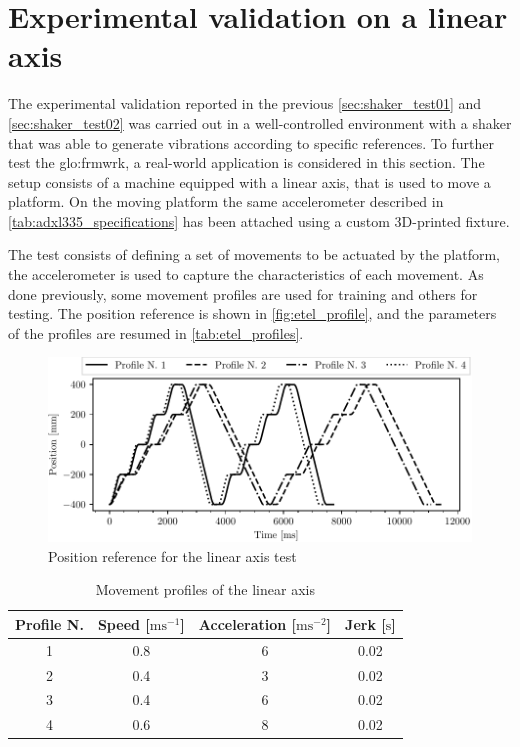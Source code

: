 \clearpage
\section{Experimental validation on a linear axis}
\label{sec:ExperimentalValidation}

The experimental validation reported in the previous \autoref{sec:shaker_test01} and \autoref{sec:shaker_test02} was carried out in a well-controlled environment with a shaker that was able to generate vibrations according to specific references. To further test the \gls{glo:frmwrk}, a real-world application is considered in this section. The setup consists of a machine equipped with a linear axis, that is used to move a platform. On the moving platform the same accelerometer described in \autoref{tab:adxl335_specifications} has been attached using a custom 3D-printed fixture.

The test consists of defining a set of movements to be actuated by the platform, the accelerometer is used to capture the characteristics of each movement. As done previously, some movement profiles are used for training and others for testing. The position reference is shown in \autoref{fig:etel_profile}, and the parameters of the profiles are resumed in \autoref{tab:etel_profiles}.

\begin{figure}
    \centering
    \includegraphics{images/LinearMotor/profiles.pdf}
    \caption{Position reference for the linear axis test}
    \label{fig:etel_profile}
\end{figure}

\begin{table}
    \centering
    \caption{Movement profiles of the linear axis}
    \label{tab:etel_profiles}
    \begin{tabular}{cccc} 
    \toprule
    \textbf{Profile N.} & \textbf{Speed} {[}$\text{m}\text{s}^{-1}$] & \textbf{Acceleration} {[}$\text{m}\text{s}^{-2}$] & \textbf{Jerk} {[}$\text{s}$] \\ 
    \hline
    1 & 0.8 & 6 & 0.02 \\
    2 & 0.4 & 3 & 0.02 \\
    3 & 0.4 & 6 & 0.02 \\
    4 & 0.6 & 8 & 0.02 \\
    \bottomrule
\end{tabular}
\end{table}

